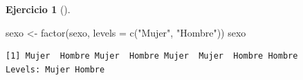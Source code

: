 \documentclass[
  a4paper,
]{scrreport}
\newenvironment{Shaded}{\begin{snugshade}}{\end{snugshade}}
\newcommand{\AttributeTok}[1]{\textcolor[rgb]{0.40,0.45,0.13}{#1}}
\newcommand{\FunctionTok}[1]{\textcolor[rgb]{0.28,0.35,0.67}{#1}}
\newcommand{\NormalTok}[1]{\textcolor[rgb]{0.00,0.23,0.31}{#1}}
\newcommand{\OtherTok}[1]{\textcolor[rgb]{0.00,0.23,0.31}{#1}}
\newcommand{\StringTok}[1]{\textcolor[rgb]{0.13,0.47,0.30}{#1}}
\theoremstyle{definition}
\newtheorem{exercise}{Ejercicio}[chapter]
\theoremstyle{remark}
\begin{document}
\begin{exercise}[]
\begin{enumerate}
\begin{tcolorbox}
\begin{Shaded}
\begin{Highlighting}[]
\NormalTok{sexo }\OtherTok{\textless{}{-}} \FunctionTok{factor}\NormalTok{(sexo, }\AttributeTok{levels =} \FunctionTok{c}\NormalTok{(}\StringTok{"Mujer"}\NormalTok{, }\StringTok{"Hombre"}\NormalTok{))}
\NormalTok{sexo}
\end{Highlighting}
\end{Shaded}

\begin{verbatim}
[1] Mujer  Hombre Mujer  Hombre Mujer  Mujer  Hombre Hombre
Levels: Mujer Hombre
\end{verbatim}

  \end{tcolorbox}
\end{enumerate}

\end{exercise}
\end{document}

